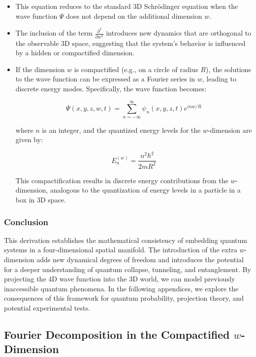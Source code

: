 \documentclass[12pt]{article}
\begin{document}
\begin{itemize}
    \item This equation reduces to the standard 3D Schrödinger equation when the wave function \( \Psi \) does not depend on the additional dimension \( w \).
    \item The inclusion of the term \( \frac{\partial^2}{\partial w^2} \) introduces new dynamics that are orthogonal to the observable 3D space, suggesting that the system’s behavior is influenced by a hidden or compactified dimension.
    \item If the dimension \( w \) is compactified (e.g., on a circle of radius \( R \)), the solutions to the wave function can be expressed as a Fourier series in \( w \), leading to discrete energy modes. Specifically, the wave function becomes:

    \begin{equation}
    \Psi(x, y, z, w, t) = \sum_{n=-\infty}^{\infty} \psi_n(x, y, z, t) e^{i n w / R}
    \end{equation}

    where \( n \) is an integer, and the quantized energy levels for the \( w \)-dimension are given by:

    \begin{equation}
    E_n^{(w)} = \frac{n^2 \hbar^2}{2m R^2}
    \end{equation}

    This compactification results in discrete energy contributions from the \( w \)-dimension, analogous to the quantization of energy levels in a particle in a box in 3D space.
\end{itemize}

\subsubsection*{Conclusion}

This derivation establishes the mathematical consistency of embedding quantum systems in a four-dimensional spatial manifold. The introduction of the extra \( w \)-dimension adds new dynamical degrees of freedom and introduces the potential for a deeper understanding of quantum collapse, tunneling, and entanglement. By projecting the 4D wave function into the 3D world, we can model previously inaccessible quantum phenomena. In the following appendices, we explore the consequences of this framework for quantum probability, projection theory, and potential experimental tests.


\subsection{Fourier Decomposition in the Compactified \texorpdfstring{$w$}{w}-Dimension}
\end{document}
